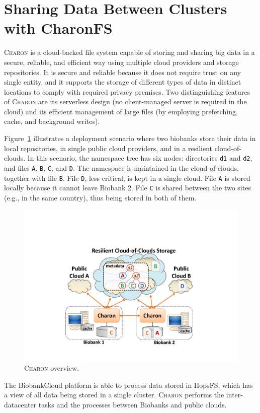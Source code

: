 \section{Sharing Data Between Clusters with CharonFS}
\label{charonfs}
\textsc{Charon} is a cloud-backed file system capable of storing and sharing big data in a secure, reliable, and efficient way using multiple cloud providers and storage repositories. 
It is secure and reliable because it does not require trust on any single entity, and it supports the storage of different types of data in distinct locations to comply with required privacy premises. 
Two distinguishing features of \textsc{Charon} are its serverless design (no client-managed server is required in the cloud) and its efficient management of large files (by employing prefetching, cache, and background writes).

Figure~\ref{fig:charon} illustrates a deployment scenario where two biobanks store their data in local repositories, in single public cloud providers, and in a resilient cloud-of-clouds. 
In this scenario, the namespace tree has six nodes: directories \texttt{d1} and \texttt{d2}, and files \texttt{A}, \texttt{B}, \texttt{C}, and \texttt{D}. 
The namespace is maintained in the cloud-of-clouds, together with file \texttt{B}.
File \texttt{D}, less critical, is kept in a single cloud.
File \texttt{A} is stored locally because it cannot leave Biobank 2. 
File \texttt{C} is shared between the two sites (e.g., in the same country), thus being stored in both of them.

\begin{figure}[ht]
 \centering
 \includegraphics[width=0.5\columnwidth]{./imgs/charon_arch.pdf}
\caption{\small \textsc{Charon} overview.}
\label{fig:charon}
\end{figure}

The BiobankCloud platform is able to process data stored in HopsFS, which has a view of all data being stored in a single cluster. \textsc{Charon} performs the inter-datacenter tasks and the processes between Biobanks and public clouds.
